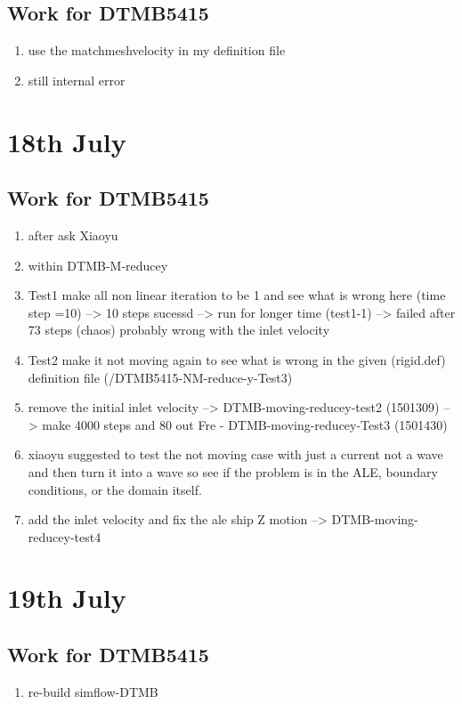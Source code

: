 \documentclass[12pt]{article} %
\begin{document}
\subsection{Work for DTMB5415}
\begin{enumerate}
    \item use the matchmeshvelocity in my definition file       
    \item still internal error  
\end{enumerate}
\section{18th July}
\subsection{Work for DTMB5415}
\begin{enumerate}
    \item after ask Xiaoyu
    \item within DTMB-M-reducey
    \item Test1 make all non linear iteration to be 1 and see what is wrong here (time step =10) --> 10 steps sucessd --> run for longer time (test1-1) --> failed after 73 steps (chaos)
    probably wrong with the inlet velocity
    \item Test2 make it not moving again to see what is wrong in the given (rigid.def) definition file (/DTMB5415-NM-reduce-y-Test3)
    \item remove the initial inlet velocity --> DTMB-moving-reducey-test2 (1501309) --> make 4000 steps and 80 out Fre - DTMB-moving-reducey-Test3 (1501430)
    \item xiaoyu suggested to test the not moving case with just a current not a wave and then turn it into a wave so see if the problem is in the ALE, boundary conditions, or the domain itself.
    \item add the inlet velocity and fix the ale ship Z motion --> DTMB-moving-reducey-test4
\end{enumerate}
\section{19th July}
\subsection{Work for DTMB5415}
\begin{enumerate}
    \item re-build simflow-DTMB
\end{enumerate}
\end{document}
